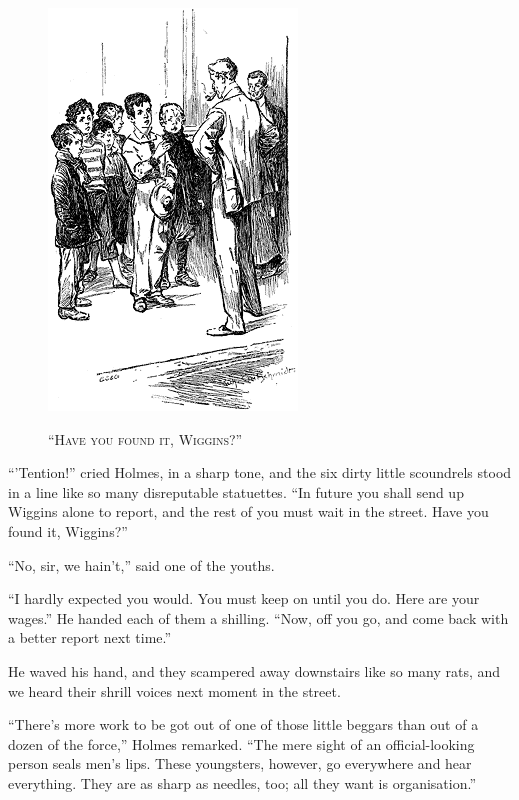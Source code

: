 \documentclass[12pt,english]{book}
\newcommand{\noun}[1]{\textsc{#1}}
\begin{document}
%
\begin{figure}[htbp]
\noindent \begin{center}\includegraphics{images/study10-stud-10.png}\end{center}

\noindent \begin{center}\noun{{}``Have you found it, Wiggins?''}\end{center}
\end{figure}
{}``'Tention!'' cried Holmes, in a sharp tone, and the six dirty
little scoundrels stood in a line like so many disreputable statuettes.
{}``In future you shall send up Wiggins alone to report, and the
rest of you must wait in the street. Have you found it, Wiggins?''

{}``No, sir, we hain't,'' said one of the youths.

{}``I hardly expected you would. You must keep on until you do. Here
are your wages.'' He handed each of them a shilling. {}``Now, off
you go, and come back with a better report next time.''

He waved his hand, and they scampered away downstairs like so many
rats, and we heard their shrill voices next moment in the street.

{}``There's more work to be got out of one of those little beggars
than out of a dozen of the force,'' Holmes remarked. {}``The mere
sight of an official-looking person seals men's lips. These youngsters,
however, go everywhere and hear everything. They are as sharp as needles,
too; all they want is organisation.''
\end{document}
